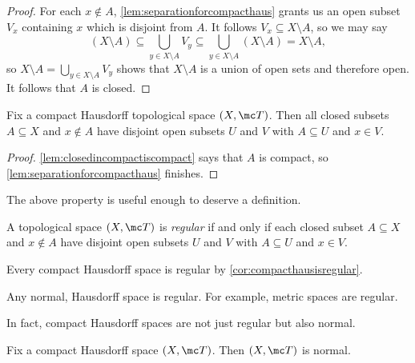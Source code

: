 \documentclass[../notes.tex]{subfiles}
\begin{document}
\begin{proof}
	For each $x\notin A$, \autoref{lem:separationforcompacthaus} grants us an open subset $V_x$ containing $x$ which is disjoint from $A$. It follows $V_x\subseteq X\setminus A$, so we may say
	\[(X\setminus A)\subseteq\bigcup_{y\in X\setminus A}V_y\subseteq\bigcup_{y\in X\setminus A}(X\setminus A)=X\setminus A,\]
	so $X\setminus A=\bigcup_{y\in X\setminus A}V_y$ shows that $X\setminus A$ is a union of open sets and therefore open. It follows that $A$ is closed.
\end{proof}
\begin{corollary} \label{cor:compacthausisregular}
	Fix a compact Hausdorff topological space $(X,\mc T)$. Then all closed subsets $A\subseteq X$ and $x\notin A$ have disjoint open subsets $U$ and $V$ with $A\subseteq U$ and $x\in V$.
\end{corollary}
\begin{proof}
	\autoref{lem:closedincompactiscompact} says that $A$ is compact, so \autoref{lem:separationforcompacthaus} finishes.
\end{proof}
The above property is useful enough to deserve a definition.
\begin{definition}[Regular]
	A topological space $(X,\mc T)$ is \textit{regular} if and only if each closed subset $A\subseteq X$ and $x\notin A$ have disjoint open subsets $U$ and $V$ with $A\subseteq U$ and $x\in V$.
\end{definition}
\begin{example}
	Every compact Hausdorff space is regular by \autoref{cor:compacthausisregular}.
\end{example}
\begin{example}
	Any normal, Hausdorff space is regular. For example, metric spaces are regular.
\end{example}
In fact, compact Hausdorff spaces are not just regular but also normal.
\begin{proposition} \label{prop:comp-haus-is-normal}
	Fix a compact Hausdorff space $(X,\mc T)$. Then $(X,\mc T)$ is normal.
\end{proposition}
\end{document}

